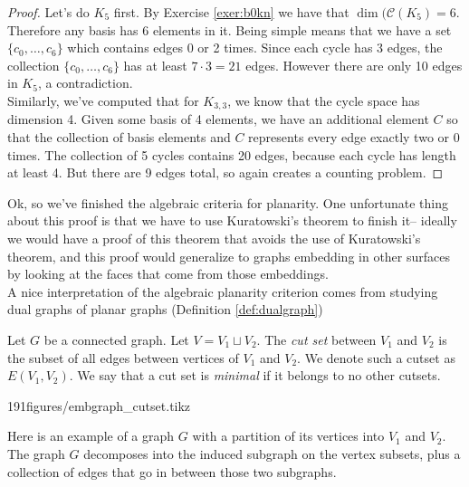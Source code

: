 \begin{proof}
 Let's do $K_5$ first. By Exercise \ref{exer:b0kn} we have that $\dim(\mathcal C(K_5)=6$. Therefore any basis has 6 elements in it. Being simple means that we have a set $\{c_0, \ldots, c_6\}$ which contains edges 0 or 2 times. Since each cycle has 3 edges, the collection $\{c_0, \ldots, c_6\}$ has at least $7\cdot 3 = 21$ edges. However there are only 10 edges in $K_5$, a contradiction.\\
 Similarly, we've computed that for $K_{3,3}$, we know that the cycle space has dimension 4. Given some basis of 4 elements, we have an additional element $C$ so that the collection of basis elements and $C$ represents every edge exactly two or 0 times. The collection of 5 cycles contains 20 edges, because each cycle has length at least 4. But there are 9 edges total, so again creates a counting problem. 
\end{proof}

Ok, so we've finished the algebraic criteria for planarity. One unfortunate thing about this proof is that we have to use Kuratowski's theorem to finish it-- ideally we would have a proof of this theorem that avoids the use of Kuratowski's theorem, and this proof would generalize to graphs embedding in other surfaces by looking at the faces that come from those embeddings.\\
A nice interpretation of the algebraic planarity criterion comes from studying dual graphs of planar graphs (Definition \ref{def:dualgraph})
\begin{definition}
Let $G$ be a connected graph. Let $V=V_1\sqcup V_2$. The \emph{cut set} between $V_1$ and $V_2$ is the subset of all edges between vertices of $V_1$ and $V_2$. We denote such a cutset as $E(V_1, V_2)$. We say that a cut set is \emph{minimal} if it belongs to no other cutsets. 
\end{definition}



\begin{examplefigureenv}{191figures/embgraph_cutset.tikz}

Here is an example of a graph $G$ with a partition of its vertices into $V_1$ and $V_2$. The graph $G$ decomposes into the induced subgraph on the vertex subsets, plus a collection of edges that go in between those two subgraphs. 
\end{examplefigureenv}


